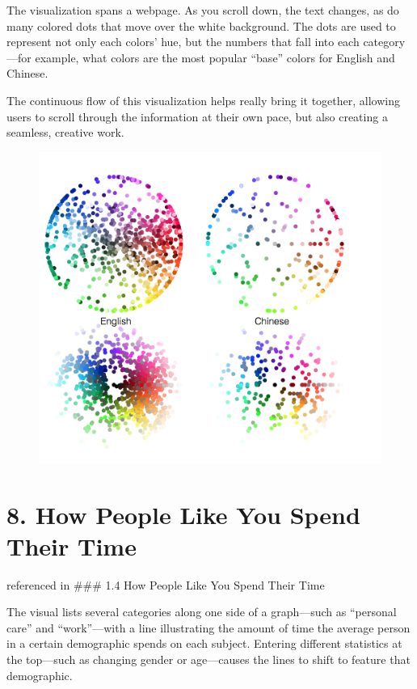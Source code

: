 \documentclass[]{book}
\theoremstyle{definition}
\theoremstyle{definition}
\theoremstyle{definition}
\theoremstyle{remark}
\begin{document}
The visualization spans a webpage. As you scroll down, the text changes,
as do many colored dots that move over the white background. The dots
are used to represent not only each colors' hue, but the numbers that
fall into each category---for example, what colors are the most popular
``base'' colors for English and Chinese.

The continuous flow of this visualization helps really bring it
together, allowing users to scroll through the information at their own
pace, but also creating a seamless, creative work.

\begin{figure}
\centering
\includegraphics{images/colorwords.png}
\caption{}
\end{figure}

\section{8. How People Like You Spend Their
Time}\label{how-people-like-you-spend-their-time}

\citep{spendingtime} referenced in \citep{cool_data} \#\#\# 1.4 How
People Like You Spend Their Time

The visual lists several categories along one side of a graph---such as
``personal care'' and ``work''---with a line illustrating the amount of
time the average person in a certain demographic spends on each subject.
Entering different statistics at the top---such as changing gender or
age---causes the lines to shift to feature that demographic.
\end{document}

